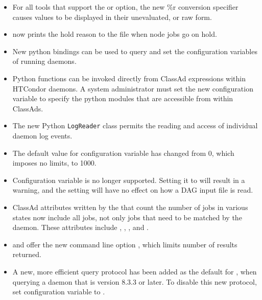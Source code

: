 \begin{itemize}
\item For all tools that support the  or  option,
the new \%r conversion specifier causes values to be displayed 
in their unevaluated, or raw form.

\item {} now prints the hold reason to the 
file when node jobs go on hold.

\item New python bindings can be used to query and set the 
configuration variables of running daemons.

\item Python functions can be invoked directly from ClassAd expressions 
within HTCondor daemons.  
A system administrator must set the new configuration variable
to specify the python modules that are accessible from within ClassAds.

\item The new Python \texttt{LogReader} class permits the reading and access
of individual daemon log events.

\item The default value for configuration variable 
 has changed from 0, 
which imposes no limits, to 1000.

\item Configuration variable 
is no longer supported.  
Setting it to  will result in a warning, 
and the setting will have no effect on how a DAG input file is read.

\item ClassAd attributes written by the  that
count the number of jobs in various states now include all jobs, 
not only jobs that need to be matched by the  daemon.
These attributes include , ,
, and .

\item {} and  offer the new command line option 
, 
which limits number of results returned.

\item A new, more efficient query protocol has been added as the default 
for ,
when querying a  daemon that is version 8.3.3 or later. 
To disable this new protocol, set configuration variable
 to .

\end{itemize}

